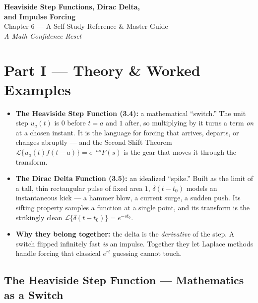 \documentclass[11pt]{article}
\begin{document}
\begin{center}
    {\Large\bfseries\color{headerblue} Heaviside Step Functions, Dirac Delta,\\[2pt] and Impulse Forcing}\\[6pt]
    \large Chapter 6 --- A Self-Study Reference \& Master Guide\\[2pt]
    \normalsize\itshape A Math Confidence Reset
\end{center}
\vspace{0.4cm}

\tableofcontents
\vspace{0.8cm}

{}
\section*{Part I --- Theory \& Worked Examples}
\setcounter{section}{3}
\setcounter{subsection}{3}

\begin{topicsbox}
\begin{itemize}[leftmargin=*, itemsep=2pt]
  \item \textbf{The Heaviside Step Function (3.4):} a mathematical ``switch.'' The unit step $u_a(t)$ is $0$ before $t = a$ and $1$ after, so multiplying by it turns a term \emph{on} at a chosen instant. It is the language for forcing that arrives, departs, or changes abruptly --- and the Second Shift Theorem $\mathcal{L}\{u_a(t)f(t-a)\} = e^{-as}F(s)$ is the gear that moves it through the transform.
  \item \textbf{The Dirac Delta Function (3.5):} an idealized ``spike.'' Built as the limit of a tall, thin rectangular pulse of fixed area $1$, $\delta(t-t_0)$ models an instantaneous kick --- a hammer blow, a current surge, a sudden push. Its sifting property samples a function at a single point, and its transform is the strikingly clean $\mathcal{L}\{\delta(t-t_0)\} = e^{-st_0}$.
  \item \textbf{Why they belong together:} the delta is the \emph{derivative} of the step. A switch flipped infinitely fast \emph{is} an impulse. Together they let Laplace methods handle forcing that classical $e^{rt}$ guessing cannot touch.
\end{itemize}
\end{topicsbox}

\subsection{The Heaviside Step Function --- Mathematics as a Switch}
\end{document}
